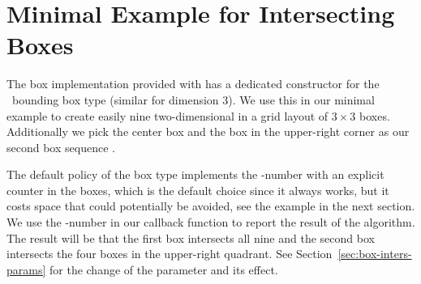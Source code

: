 



\section{Minimal Example for Intersecting Boxes\label{sec:box-intersect-minimal}}

The box implementation provided with
 has a dedicated
constructor for the \cgal\ bounding box type 
(similar for dimension 3). We use this in our minimal example to
create easily nine two-dimensional  in a grid layout of $3
\times 3$ boxes. Additionally we pick the center box and the box in
the upper-right corner as our second box sequence .

The default policy of the box type implements the -number with
an explicit counter in the boxes, which is the default choice since it
always works, but it costs space that could potentially be avoided,
see the example in the next section. We use the -number in our
callback function to report the result of the  algorithm.
The result will be that the first  box intersects all nine
 and the second  box intersects the four boxes
in the upper-right quadrant. See Section~\ref{sec:box-inters-params}
for the change of the  parameter and its effect.

